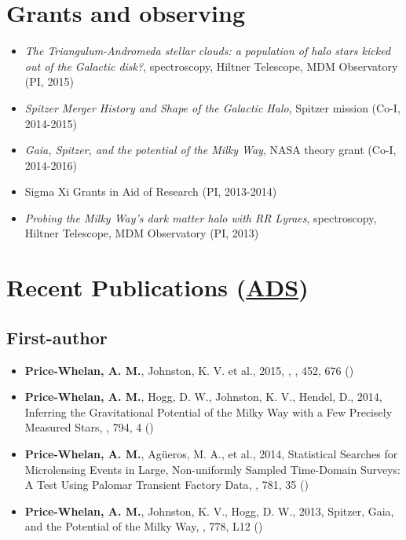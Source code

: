\documentclass[12pt,letterpaper]{article}
\begin{document}
\section*{Grants and observing }
	\begin{itemize}
	\item {\it The Triangulum-Andromeda stellar clouds: a population of halo stars kicked out of the Galactic disk?}, spectroscopy, Hiltner Telescope, MDM Observatory (PI, 2015)
	\item {\it Spitzer Merger History and Shape of the Galactic Halo}, Spitzer mission (Co-I, 2014-2015)
	\item {\it Gaia, Spitzer, and the potential of the Milky Way}, NASA theory grant (Co-I, 2014-2016)
	\item Sigma Xi Grants in Aid of Research (PI, 2013-2014)
	\item {\it Probing the Milky Way's dark matter halo with RR Lyraes}, spectroscopy, Hiltner Telescope, MDM Observatory (PI, 2013)
	\end{itemize}

\section*{Recent Publications (\href{\adsurl}{ADS})}
	\subsection*{First-author}
	\begin{itemize}

\item {\bf Price-Whelan, A. M.}, Johnston, K. V. et al., 2015,
    ,
    \mnras, 452, 676 ()

\item {\bf Price-Whelan, A. M.}, Hogg, D. W., Johnston, K. V., Hendel, D., 2014,
    {Inferring the Gravitational Potential of the Milky Way with a Few Precisely Measured Stars},
    \apj, 794, 4 ()

\item {\bf Price-Whelan, A. M.}, Ag\"ueros, M. A., et al., 2014,
    {Statistical Searches for Microlensing Events in Large, Non-uniformly Sampled Time-Domain Surveys: A Test Using Palomar Transient Factory Data},
    \apj, 781, 35 ()

\item {\bf Price-Whelan, A. M.}, Johnston, K. V., Hogg, D. W., 2013,
    {Spitzer, Gaia, and the Potential of the Milky Way},
    \apjl, 778, L12 ()

	\end{itemize}
\end{document}
